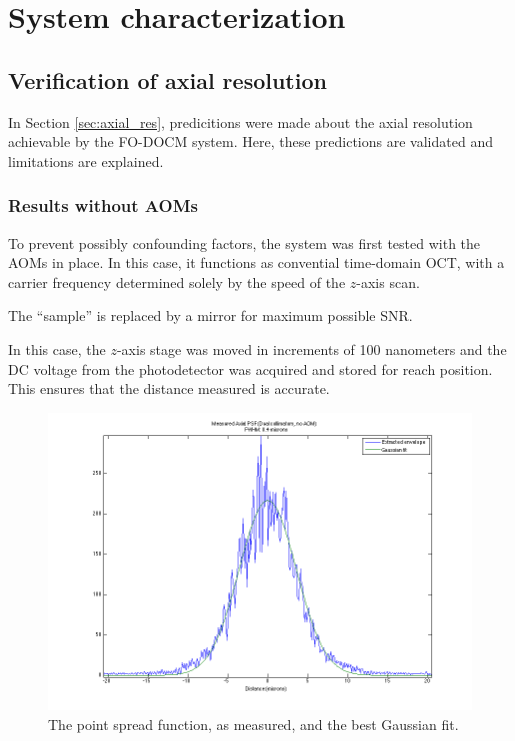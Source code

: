 \chapter{System characterization}

\section{Verification of axial resolution}

In Section \ref{sec:axial_res}, predicitions were made about the axial resolution achievable by the FO-DOCM system. Here, these predictions are validated and limitations are explained.

\subsection{Results without AOMs}

To prevent possibly confounding factors, the system was first tested with the AOMs in place. In this case, it functions as convential time-domain OCT, with a carrier frequency determined solely by the speed of the $z$-axis scan.

The ``sample'' is replaced by a mirror for maximum possible SNR.

In this case, the $z$-axis stage was moved in increments of 100 nanometers and the DC voltage from the photodetector was acquired and stored for reach position. This ensures that the distance measured is accurate.

\begin{figure}[h!]
\centering
\includegraphics[width=1.0\textwidth]{Images/Results/psf-noaom.png}
\caption{The point spread function, as measured, and the best Gaussian fit.}
\end{figure}

